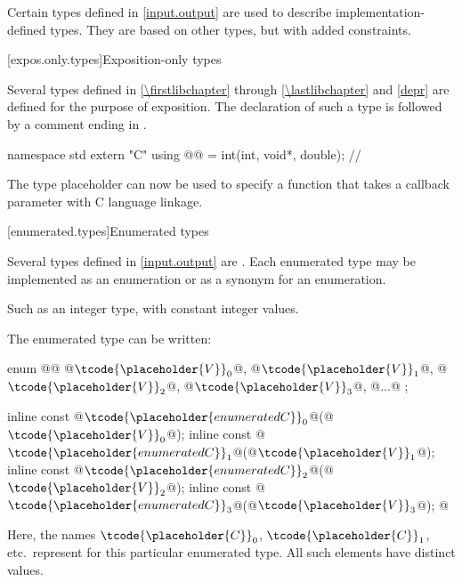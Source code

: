 \pnum
Certain types defined in \ref{input.output} are used to describe implementation-defined types.
%
They are based on other types, but with added constraints.

[expos.only.types]{Exposition-only types}

\pnum
Several types defined in \ref{\firstlibchapter} through \ref{\lastlibchapter}
and \ref{depr} are defined for the purpose of exposition.
The declaration of such a type is followed by a comment ending in \expos.
\begin{example}
\begin{codeblock}
namespace std {
  extern "C" using @@ = int(int, void*, double);  // \expos
}
\end{codeblock}
The type placeholder  can now be used to specify a function
that takes a callback parameter with C language linkage.
\end{example}

[enumerated.types]{Enumerated types}

\pnum
Several types defined in \ref{input.output} are
.
Each enumerated type may be implemented as an enumeration or as a synonym for
an enumeration.
\begin{footnote}
Such as an integer type, with constant integer
values.
\end{footnote}

\pnum
The enumerated type  can be written:
\begin{codeblock}
enum @@ { @$\tcode{\placeholder{V}}_{0}$@, @$\tcode{\placeholder{V}}_{1}$@, @$\tcode{\placeholder{V}}_{2}$@, @$\tcode{\placeholder{V}}_{3}$@, @$\ldots$@ };

inline const @$\tcode{\placeholder{enumerated C}}_{0}$@(@$\tcode{\placeholder{V}}_{0}$@);
inline const @$\tcode{\placeholder{enumerated C}}_{1}$@(@$\tcode{\placeholder{V}}_{1}$@);
inline const @$\tcode{\placeholder{enumerated C}}_{2}$@(@$\tcode{\placeholder{V}}_{2}$@);
inline const @$\tcode{\placeholder{enumerated C}}_{3}$@(@$\tcode{\placeholder{V}}_{3}$@);
  @\vdots@
\end{codeblock}

\pnum
Here, the names $\tcode{\placeholder{C}}_0$,
$\tcode{\placeholder{C}}_1$, etc.\ represent
for this particular enumerated type.
%
All such elements have distinct values.

